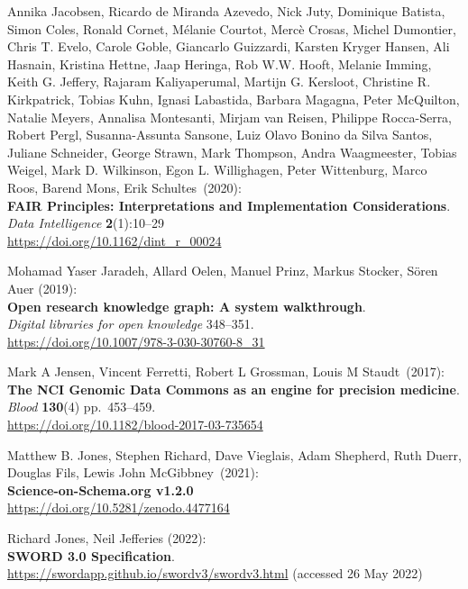 \begin{thebibliography}{9}
Annika Jacobsen, Ricardo de Miranda Azevedo, Nick Juty, Dominique Batista, Simon Coles, Ronald Cornet, Mélanie Courtot, Mercè Crosas, Michel Dumontier, Chris T. Evelo, Carole Goble, Giancarlo Guizzardi, Karsten Kryger Hansen, Ali Hasnain, Kristina Hettne, Jaap Heringa, Rob W.W. Hooft, Melanie Imming, Keith G. Jeffery, Rajaram Kaliyaperumal, Martijn G. Kersloot, Christine R. Kirkpatrick, Tobias Kuhn, Ignasi Labastida, Barbara Magagna, Peter McQuilton, Natalie Meyers, Annalisa Montesanti, Mirjam van Reisen, Philippe Rocca-Serra, Robert Pergl, Susanna-Assunta Sansone, Luiz Olavo Bonino da Silva Santos, Juliane Schneider, George Strawn, Mark Thompson, Andra Waagmeester, Tobias Weigel, Mark D. Wilkinson, Egon L. Willighagen, Peter Wittenburg, Marco Roos, Barend Mons, Erik Schultes~(2020):\\
\textbf{FAIR Principles: Interpretations and Implementation
Considerations}.\\
\emph{Data Intelligence} \textbf{2}(1):10--29\\
\url{https://doi.org/10.1162/dint_r_00024}

Mohamad Yaser Jaradeh, Allard Oelen, Manuel Prinz, Markus Stocker, Sören Auer (2019): \\
\textbf{Open research knowledge graph: A system walkthrough}. \\
\emph{Digital libraries for open knowledge} 348--351.\\
\url{https://doi.org/10.1007/978-3-030-30760-8_31}

Mark A Jensen, Vincent Ferretti, Robert L Grossman, Louis M
Staudt~(2017):\\
\textbf{The NCI Genomic Data Commons as an engine for precision
medicine}.\\
\emph{Blood} \textbf{130}(4) pp.~453--459.\\
\url{https://doi.org/10.1182/blood-2017-03-735654}

Matthew B. Jones, Stephen Richard, Dave Vieglais, Adam
Shepherd, Ruth Duerr, Douglas Fils, Lewis John McGibbney~(2021):\\
\textbf{Science-on-Schema.org v1.2.0}\\
\url{https://doi.org/10.5281/zenodo.4477164}

Richard Jones, Neil Jefferies (2022): \\
\textbf{SWORD 3.0 Specification}. \\
\url{https://swordapp.github.io/swordv3/swordv3.html} (accessed 26 May
2022)


\end{thebibliography}
